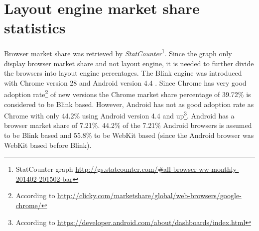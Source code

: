 \documentclass[a4paper,11pt]{kth-mag}
\begin{document}
      \section{Layout engine market share statistics}\label{sec:layout_engines_market_share}
        Browser market share was retrieved by \emph{StatCounter}\footnote{StatCounter graph \url{http://gs.statcounter.com/\#all-browser-ww-monthly-201402-201502-bar}}.
        Since the graph only display \gls{browser} market share and not \gls{layout engine}, it is needed to further divide the \glspl{browser} into \gls{layout engine} percentages.
        The Blink engine was introduced with Chrome version 28 and Android version 4.4 \cite{wiki_blink}.
        Since Chrome has very good adoption rate\footnote{According to \url{http://clicky.com/marketshare/global/web-browsers/google-chrome/}} of new versions the Chrome market share percentage of 39.72\% is considered to be Blink based.
        However, Android has not as good adoption rate as Chrome with only 44.2\% using Android version 4.4 and up\footnote{According to \url{https://developer.android.com/about/dashboards/index.html}}.
        Android has a \gls{browser} market share of 7.21\%. 44.2\% of the 7.21\% Android \glspl{browser} is assumed to be Blink based and 55.8\% to be \gls{WebKit} based (since the Android \gls{browser} was \gls{WebKit} based before Blink).
\end{document}
